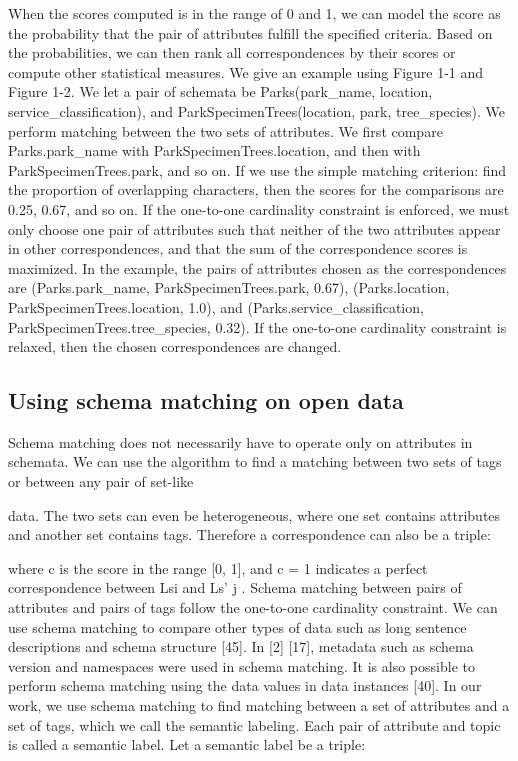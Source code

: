 When the scores computed is in the range of 0 and 1, we can model the score as the probability that the pair of attributes fulfill the specified criteria. Based on the probabilities, we can then rank all correspondences by their scores or compute other statistical measures.
We give an example using Figure 1-1 and Figure 1-2. We let a pair of schemata be
Parks(park\_name, location, service\_classification), and
ParkSpecimenTrees(location, park, tree\_species).
We perform matching between the two sets of attributes. We first compare Parks.park\_name with ParkSpecimenTrees.location, and then with ParkSpecimenTrees.park, and so on. If we use the simple matching criterion: find the proportion of overlapping characters, then the scores for the comparisons are 0.25, 0.67, and so on. If the one-to-one cardinality constraint is enforced, we must only choose one pair of attributes such that neither of the two attributes appear in other correspondences, and that the sum of the correspondence scores is maximized. In the example, the pairs of attributes chosen as the correspondences are
(Parks.park\_name, ParkSpecimenTrees.park, 0.67),
(Parks.location, ParkSpecimenTrees.location, 1.0), and
(Parks.service\_classification, ParkSpecimenTrees.tree\_species, 0.32).
If the one-to-one cardinality constraint is relaxed, then the chosen correspondences are changed.

\subsection{Using schema matching on open data}
\label{ssec:UsingSchemaMatchingOnOpenData}

Schema matching does not necessarily have to operate only on attributes in schemata. We can use the algorithm to find a matching between two sets of tags or between any pair of set-like

data. The two sets can even be heterogeneous, where one set contains attributes and another set contains tags.
Therefore a correspondence can also be a triple:

where c is the score in the range [0, 1], and c = 1 indicates a perfect correspondence between Lsi and Ls' j . Schema matching between pairs of attributes and pairs of tags follow the one-to-one cardinality constraint.
We can use schema matching to compare other types of data such as long sentence descriptions and schema structure \cite{Sorrentino2011NORMS}[45]. In \cite{10.1145/1066157.1066283}[2] \cite{Duchateau2009YAM}[17], metadata such as schema version and namespaces were used in schema matching. It is also possible to perform schema matching using the data values in data instances \cite{Rahm2001Survey}[40]. In our work, we use schema matching to find matching between a set of attributes and a set of tags, which we call the semantic labeling. Each pair of attribute and topic is called a semantic label.
Let a semantic label be a triple:

